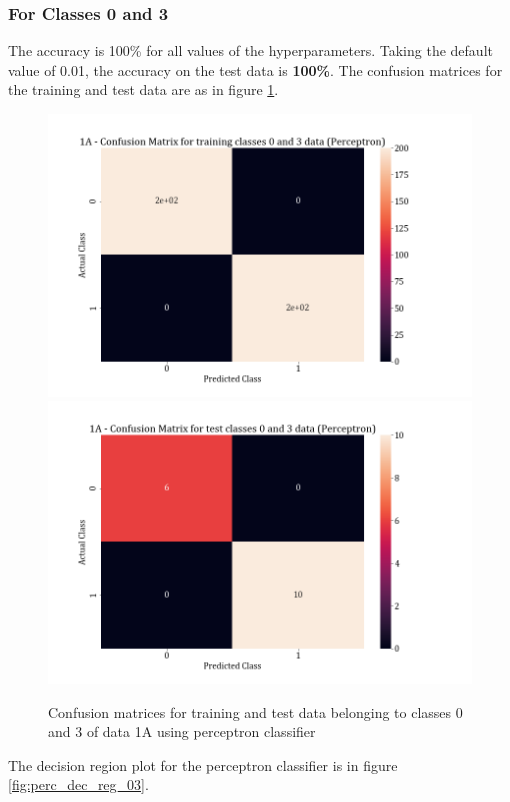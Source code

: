 \documentclass[11pt,a4paper]{article}
\begin{document}
\subsubsection{For Classes 0 and 3}

The accuracy is 100\% for all values of the hyperparameters. Taking the default value of 0.01, the accuracy on the test data is \textbf{100\%}. The confusion matrices for the training and test data are as in figure \ref{fig:perc_conf_03}.
\begin{figure}[H]
    \centering
    \includegraphics[scale=0.27]{images/perceptron_training classes 0 and 3_confmat.png}
    \includegraphics[scale = 0.27]{images/perceptron_test classes 0 and 3_confmat.png}
    \caption{Confusion matrices for training and test data belonging to classes 0 and 3 of data 1A using perceptron classifier}
    \label{fig:perc_conf_03}
\end{figure}
The decision region plot for the perceptron classifier is in figure \ref{fig:perc_dec_reg_03}.
\end{document}
